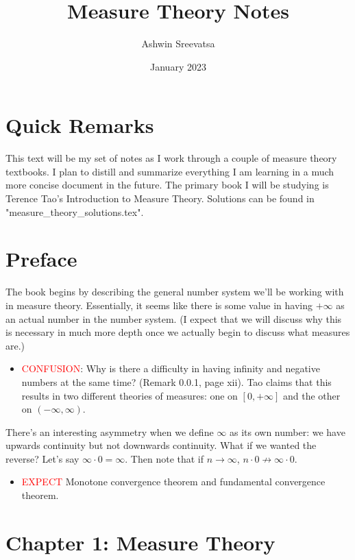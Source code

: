 \documentclass[answers,12pt]{exam}
\title{Measure Theory Notes}
\author{Ashwin Sreevatsa}
\date{January 2023}
\begin{document}
\maketitle
\setcounter{section}{-1}

\section*{Quick Remarks}
This text will be my set of notes as I work through a couple of measure theory textbooks.
I plan to distill and summarize everything I am learning in a much more concise document in the future.
The primary book I will be studying is Terence Tao's Introduction to Measure Theory.
Solutions can be found in "measure\_theory\_solutions.tex".

\section{Preface}

The book begins by describing the general number system we'll be working with in measure theory. 
Essentially, it seems like there is some value in having $ + \infty$ as an actual number in the number system.
(I expect that we will discuss why this is necessary in much more depth once we actually begin to discuss what measures are.)

\begin{itemize}
    \item \textcolor{red}{CONFUSION}: Why is there a difficulty in having infinity and negative numbers at the same time? (Remark 0.0.1, page xii).
    Tao claims that this results in two different theories of measures: one on $[0,+\infty]$ and the other on $(-\infty, \infty)$.
\end{itemize}

There's an interesting asymmetry when we define $\infty$ as its own number: we have upwards continuity but not downwards continuity.
What if we wanted the reverse? 
Let's say $\infty \cdot 0 = \infty$. 
Then note that if $n \to \infty$, $n \cdot 0 \not \to \infty \cdot 0$.

\begin{itemize}
    \item \textcolor{red}{EXPECT} Monotone convergence theorem and fundamental convergence theorem.
\end{itemize}

\section{Chapter 1: Measure Theory}
\end{document}

